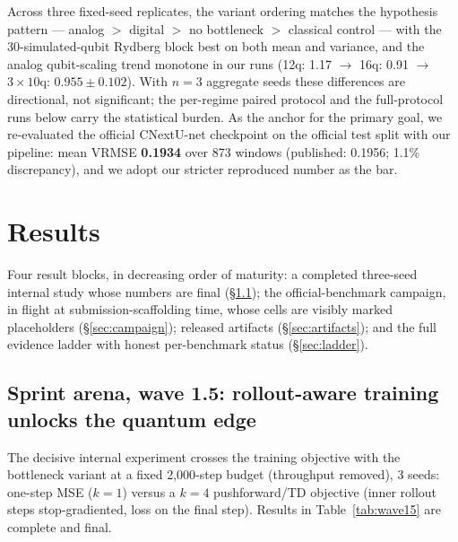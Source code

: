 \documentclass{article}
\begin{document}
Across three fixed-seed replicates, the variant ordering matches the
hypothesis pattern --- analog $>$ digital $>$ no bottleneck $>$ classical
control --- with the 30-simulated-qubit Rydberg block best on both mean and
variance, and the analog qubit-scaling trend monotone in our runs
(12q: 1.17 $\to$ 16q: 0.91 $\to$ $3{\times}10$q: $0.955 \pm 0.102$). With
$n{=}3$ aggregate seeds these differences are directional, not significant;
the per-regime paired protocol and the full-protocol runs below carry the
statistical burden. As the anchor for the primary goal, we re-evaluated the
official CNextU-net checkpoint on the official test split with our pipeline:
mean VRMSE \textbf{0.1934} over 873 windows (published: 0.1956; 1.1\%
discrepancy), and we adopt our stricter reproduced number as the bar.

\section{Results}
\label{sec:results}

Four result blocks, in decreasing order of maturity: a completed
three-seed internal study whose numbers are final
(\S\ref{sec:wave15}); the official-benchmark campaign, in flight at
submission-scaffolding time, whose cells are visibly marked placeholders
(\S\ref{sec:campaign}); released artifacts (\S\ref{sec:artifacts}); and the
full evidence ladder with honest per-benchmark status (\S\ref{sec:ladder}).

\subsection{Sprint arena, wave 1.5: rollout-aware training unlocks the
quantum edge}
\label{sec:wave15}

The decisive internal experiment crosses the training objective with the
bottleneck variant at a fixed 2{,}000-step budget (throughput removed), 3
seeds: one-step MSE ($k{=}1$) versus a $k{=}4$ pushforward/TD objective
(inner rollout steps stop-gradiented, loss on the final step). Results in
Table~\ref{tab:wave15} are complete and final.
\end{document}
